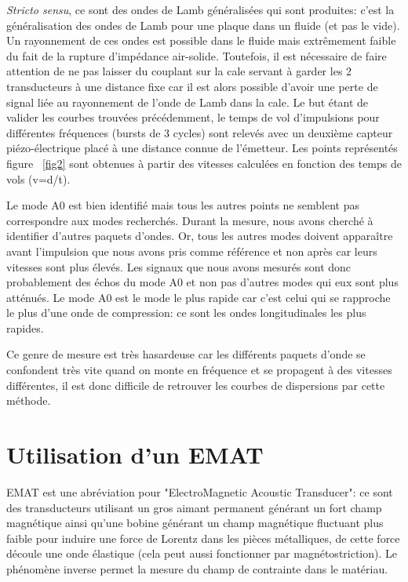 \documentclass[twoside]{article}
\begin{document}
\begin{multicols}{2}
\emph{Stricto sensu}, ce sont des ondes de Lamb généralisées qui sont produites: c'est la généralisation des ondes de Lamb pour une plaque dans un fluide (et pas le vide). Un rayonnement de ces ondes est possible dans le fluide mais extrêmement faible du fait de la rupture d'impédance air-solide. Toutefois, il est nécessaire de faire attention de ne pas laisser du couplant sur la cale servant à garder les 2 transducteurs à une distance fixe car il est alors possible d'avoir une perte de signal liée au rayonnement de l'onde de Lamb dans la cale.
Le but étant de valider les courbes trouvées précédemment, le temps de vol d'impulsions pour différentes fréquences (bursts de 3 cycles) sont relevés avec un deuxième capteur piézo-électrique placé à une distance connue de l'émetteur. Les points représentés figure ~\ref{fig2} sont obtenues à partir des vitesses calculées en fonction des temps de vols (v=d/t).\\

\bigskip

Le mode A0 est bien identifié mais tous les autres points ne semblent pas correspondre aux modes recherchés. Durant la mesure, nous avons cherché à identifier d'autres paquets d'ondes. Or, tous les autres modes doivent apparaître avant l'impulsion que nous avons pris comme référence et non après car leurs vitesses sont plus élevés. Les signaux que nous avons mesurés sont donc probablement des échos du mode A0 et non pas d'autres modes qui eux sont plus atténués.
Le mode A0 est le mode le plus rapide car c'est celui qui se rapproche le plus d'une onde de compression: ce sont les ondes longitudinales les plus rapides.

\bigskip 

Ce genre de mesure est très hasardeuse car les différents paquets d'onde se confondent très vite quand on monte en fréquence et se propagent à des vitesses différentes, il est donc difficile de retrouver les courbes de dispersions par cette méthode.



\section{Utilisation d'un EMAT}
EMAT est une abréviation pour "ElectroMagnetic Acoustic Transducer": ce sont des transducteurs utilisant un gros aimant permanent générant un fort champ magnétique ainsi qu'une bobine générant un champ magnétique fluctuant plus faible pour induire une force de Lorentz dans les pièces métalliques, de cette force découle une onde élastique (cela peut aussi fonctionner par magnétostriction). Le phénomène inverse permet la mesure du champ de contrainte dans le matériau.


\end{multicols}
\end{document}
